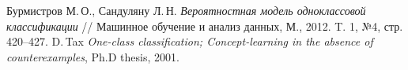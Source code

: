 \documentclass[12pt,a4paper,oneside]{article}
\begin{document}

\begin{thebibliography}{99}
	 Бурмистров М.\,О., Сандуляну Л.\,Н. \textit{Вероятностная модель одноклассовой классификации} // Машинное обучение и анализ данных, М., 2012. T. 1, №4, стр. 420--427.
	 D.\,Tax \textit{One-class classification; Concept-learning in the absence of
	counterexamples}, Ph.D thesis, 2001.
\end{thebibliography}
\end{document}
